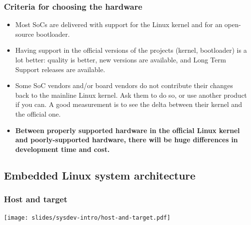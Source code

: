 \begin{frame}
  \frametitle{Criteria for choosing the hardware}
  \begin{itemize}
  \item Most SoCs are delivered with support for the Linux kernel
    and for an open-source bootloader.
  \item Having support in the official versions of the projects
    (kernel, bootloader) is a lot better: quality is better, new
    versions are available, and Long Term Support releases are
    available.
  \item Some SoC vendors and/or board vendors do not contribute their
    changes back to the mainline Linux kernel. Ask them to do so, or
    use another product if you can. A good measurement is to see the
    delta between their kernel and the official one.
  \item {\bf Between properly supported hardware in the official Linux
      kernel and poorly-supported hardware, there will be huge
      differences in development time and cost.}
  \end{itemize}
\end{frame}

\subsection{Embedded Linux system architecture}

\begin{frame}
  \frametitle{Host and target}
  \begin{center}
    \texttt{[image: slides/sysdev-intro/host-and-target.pdf]}
  \end{center}
\end{frame}

